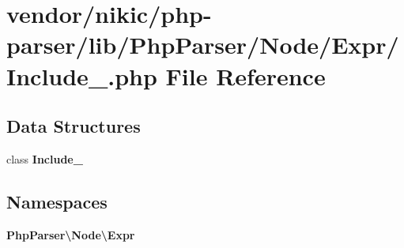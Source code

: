 \section{vendor/nikic/php-\/parser/lib/\+Php\+Parser/\+Node/\+Expr/\+Include\+\_\+.php File Reference}
\label{_include___8php}
\subsection*{Data Structures}
\begin{DoxyCompactItemize}
\item 
class {\bf Include\+\_\+}
\end{DoxyCompactItemize}
\subsection*{Namespaces}
\begin{DoxyCompactItemize}
\item 
 {\bf Php\+Parser\textbackslash{}\+Node\textbackslash{}\+Expr}
\end{DoxyCompactItemize}

